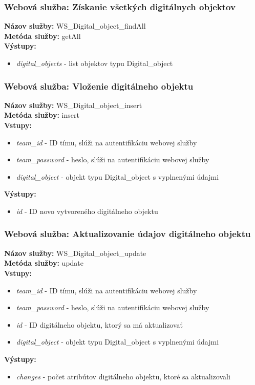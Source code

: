 \documentclass[10pt,oneside,slovak,a4paper]{article}
\begin{document}
\subsubsection{Webová služba: Získanie všetkých digitálnych objektov}
\textbf{Názov služby:} WS\_Digital\_object\_findAll\\
\textbf{Metóda služby:} getAll\\
\textbf{Výstupy:}
	\begin{itemize}
		\item \textit{digital\_objects} - list objektov typu Digital\_object
	\end{itemize}
	
\subsubsection{Webová služba: Vloženie digitálneho objektu}
\textbf{Názov služby:} WS\_Digital\_object\_insert\\
\textbf{Metóda služby:} insert\\
\textbf{Vstupy:}
	\begin{itemize}
		\item \textit{team\_id} - ID tímu, slúži na autentifikáciu webovej služby
		\item \textit{team\_password} - heslo, slúži na autentifikáciu webovej služby
		\item \textit{digital\_object} - objekt typu Digital\_object s vyplnenými údajmi
	\end{itemize}
\textbf{Výstupy:}
	\begin{itemize}
		\item \textit{id} - ID novo vytvoreného digitálneho objektu
	\end{itemize}
	
\subsubsection{Webová služba: Aktualizovanie údajov digitálneho objektu}
\textbf{Názov služby:} WS\_Digital\_object\_update\\
\textbf{Metóda služby:} update\\
\textbf{Vstupy:}
	\begin{itemize}
		\item \textit{team\_id} - ID tímu, slúži na autentifikáciu webovej služby
		\item \textit{team\_password} - heslo, slúži na autentifikáciu webovej služby
		\item \textit{id} - ID digitálneho objektu, ktorý sa má aktualizovať
		\item \textit{digital\_object} - objekt typu Digital\_object s vyplnenými údajmi
	\end{itemize}
\textbf{Výstupy:}
	\begin{itemize}
		\item \textit{changes} - počet atribútov digitálneho objektu, ktoré sa aktualizovali
	\end{itemize}
	
\end{document}
